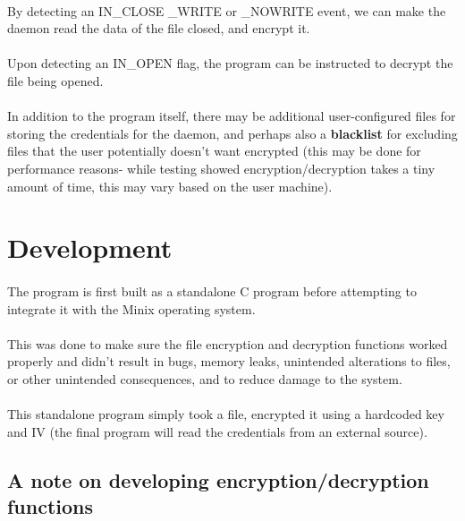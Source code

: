 \documentclass{article}
\begin{document}
    \paragraph{}By detecting an IN\_CLOSE \_WRITE or \_NOWRITE event, we can make the daemon read the data of the file closed, and encrypt it.
    \paragraph{}Upon detecting an IN\_OPEN flag, the program can be instructed to decrypt the file being opened.
    \paragraph{}In addition to the program itself, there may be additional user-configured files for storing the credentials for the daemon, and perhaps also a \textbf{blacklist} for excluding files that the user potentially doesn't want encrypted (this may be done for performance reasons- while testing showed encryption/decryption takes a tiny amount of time, this may vary based on the user machine).

\section{Development}
    \paragraph{}The program is first built as a standalone C program before attempting to integrate it with the Minix operating system. 
    \paragraph{}This was done to make sure the file encryption and decryption functions worked properly and didn't result in bugs, memory leaks, unintended alterations to files, or other unintended consequences, and to reduce damage to the system.
    \paragraph{}This standalone program simply took a file, encrypted it using a hardcoded key and IV (the final program will read the credentials from an external source).

    \subsection{A note on developing encryption/decryption functions}
\end{document}
